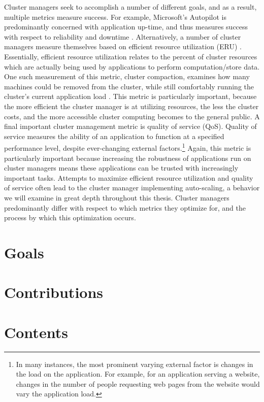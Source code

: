 Cluster managers seek to accomplish a number of different goals, and as a
result, multiple metrics measure success. For example, Microsoft's Autopilot is
predominantly concerned with application up-time, and thus measures success
with respect to reliability and downtime \cite{autopilot}.
Alternatively, a number of cluster managers measure themselves based on
efficient resource utilization (ERU) \cite{borg}. Essentially, efficient
resource utilization relates to the percent of cluster resources which are
actually being used by applications to perform computation/store data.
One such measurement of this metric, cluster
compaction, examines how many machines could be removed from the cluster, while
still comfortably running the cluster's current application load
\cite{evaluating-job-packing-in-warehouse-scale-computing}. This metric is
particularly important, because the more efficient the cluster manager is at
utilizing resources, the less the cluster costs, and the more accessible cluster
computing becomes to the general public. A final important
cluster management metric is quality of service (QoS). Quality of service measures the
ability of an application to function at a specified
performance level, despite ever-changing external factors.\footnote{In many instances, the most
prominent varying external factor is changes
in the load on the application. For example, for an application serving a
website, changes in the number of people requesting web pages from the website
would vary the application load.} Again, this metric is particularly important because
increasing the robustness of applications run on cluster managers means
these applications can be trusted with increasingly important tasks. Attempts to
maximize efficient resource utilization and quality of service
often lead to the cluster manager implementing
auto-scaling, a behavior we will examine in great depth throughout this thesis. Cluster
managers predominantly differ with respect to which metrics they optimize
for, and the process by which this optimization occurs.

\section{Goals}



\section{Contributions}



\section{Contents}


